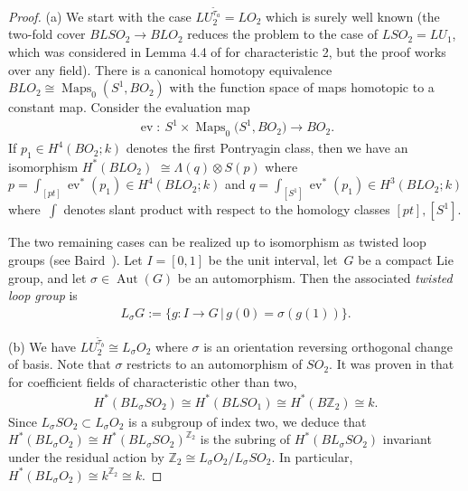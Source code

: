 \documentclass[10pt,a4paper]{amsart}
\numberwithin{equation}{section}
\begin{document}
\begin{proof}
(a) We start with the case $LU_2^{{\tilde{\tau}}_a} = LO_2$ which is surely well known (the two-fold cover $BLSO_2 \rightarrow BLO_2$ reduces the problem to the case of $LSO_2 = LU_1$, which was considered in Lemma 4.4 of \cite{B} for characteristic 2, but the proof works over any f\/ield). There is a canonical homotopy equivalence
$BLO_2 \cong \operatorname{Maps}_0(S^1, BO_2)$ with the function space of maps homotopic to a constant map. Consider the evaluation map
\begin{gather*}\operatorname{ev}\colon \ S^1 \times \operatorname{Maps}_0\big(S^1, BO_2\big) \rightarrow BO_2.\end{gather*}
If $p_1\in H^4(BO_2;k)$ denotes the f\/irst Pontryagin class, then we have an isomorphism $ H^*(BLO_2)$ $\cong \Lambda(q) \otimes S(p)$ where $p = \int_{[pt]} \operatorname{ev}^*(p_1) \in H^4(BLO_2; k)$ and $q = \int_{[S^1]}\operatorname{ev}^*(p_1) \in H^3(BLO_2;k)$ where~$\int$ denotes slant product with respect to the homology classes $[pt], [S^1]$.

The two remaining cases can be realized up to isomorphism as twisted loop groups (see Baird~\cite{B2}). Let $I=[0,1]$ be the unit interval, let~$G$ be a compact Lie group, and let $\sigma \in \operatorname{Aut}(G)$ be an automorphism. Then the associated \emph{twisted loop group} is
\begin{gather*} L_{\sigma}G := \{ g\colon I \rightarrow G\,|\, g(0) = \sigma(g(1))\}. \end{gather*}

(b) We have $LU_2^{{\tilde{\tau}}_b} \cong L_{\sigma}O_2$ where $\sigma$ is an orientation reversing orthogonal change of basis. Note that $\sigma$ restricts to an automorphism of $SO_2$. It was proven in \cite[Proposition~7.6]{B2} that for coef\/f\/icient f\/ields of characteristic other than two, \begin{gather*}H^*(BL_{\sigma}SO_2) \cong H^*(BLSO_1) \cong H^*(B{\mathbb Z}_2) \cong k.\end{gather*}
 Since $L_{\sigma}SO_2 \subset L_{\sigma} O_2$ is a subgroup of index two, we deduce that $H^*(BL_{\sigma}O_2) \cong H^*(BL_{\sigma}SO_2)^{{\mathbb Z}_2}$ is the subring of $H^*(BL_{\sigma}SO_2)$ invariant under the residual action by ${\mathbb Z}_2 \cong L_{\sigma}O_2 /L_{\sigma}SO_2$. In particular, $H^*(BL_{\sigma}O_2) \cong k^{{\mathbb Z}_2} \cong k$.


\end{proof}
\end{document}
